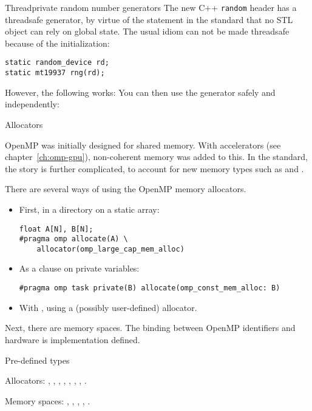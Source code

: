 \begin{cppnote}{Threadprivate random number generators}
  The new C++ \lstinline{random} header has a threadsafe generator,
  by virtue of the statement in the standard that no STL object
  can rely on global state.
  The usual idiom 
can not be made threadsafe because of the initialization:
\begin{lstlisting}
static random_device rd;
static mt19937 rng(rd);    
\end{lstlisting}

However, the following works:
%
%
You can then use the generator safely and independently:
%
\end{cppnote}

 {Allocators}

OpenMP was initially designed for shared memory.
With accelerators (see chapter~\ref{ch:omp-gpu}), non-coherent memory was added to this.
In the  standard, the story is further complicated, to account
for new memory types such as 
and .

There are several ways of using the OpenMP memory allocators.
\begin{itemize}
\item
  First, in a directory on a static array:
\begin{lstlisting}
float A[N], B[N];
#pragma omp allocate(A) \
    allocator(omp_large_cap_mem_alloc)
\end{lstlisting}
\item As a clause on private variables:
\begin{lstlisting}
#pragma omp task private(B) allocate(omp_const_mem_alloc: B)
\end{lstlisting}
\item
  With , using a (possibly user-defined) allocator.
\end{itemize}

Next, there are memory spaces. The binding between OpenMP identifiers and hardware
is implementation defined.

 {Pre-defined types}

Allocators:
,
,
,
,
,
,
,
.

Memory spaces:
,
,
,
,
.
